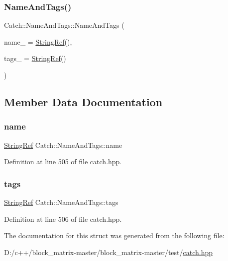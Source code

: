 \subsubsection{\texorpdfstring{Name\+And\+Tags()}{NameAndTags()}}
{\footnotesize\ttfamily Catch\+::\+Name\+And\+Tags\+::\+Name\+And\+Tags (\begin{DoxyParamCaption}\item[{\mbox{\hyperlink{class_catch_1_1_string_ref}{String\+Ref}} const \&}]{name\+\_\+ = {\ttfamily \mbox{\hyperlink{class_catch_1_1_string_ref}{String\+Ref}}()},  }\item[{\mbox{\hyperlink{class_catch_1_1_string_ref}{String\+Ref}} const \&}]{tags\+\_\+ = {\ttfamily \mbox{\hyperlink{class_catch_1_1_string_ref}{String\+Ref}}()} }\end{DoxyParamCaption})\hspace{0.3cm}{\ttfamily [noexcept]}}



\subsection{Member Data Documentation}
\mbox{\label{struct_catch_1_1_name_and_tags_a7cbea60e0cebfa622c667008eb011420}} 
\subsubsection{\texorpdfstring{name}{name}}
{\footnotesize\ttfamily \mbox{\hyperlink{class_catch_1_1_string_ref}{String\+Ref}} Catch\+::\+Name\+And\+Tags\+::name}



Definition at line 505 of file catch.\+hpp.

\mbox{\label{struct_catch_1_1_name_and_tags_a74062ed1138834a348424eb7ed900c57}} 
\subsubsection{\texorpdfstring{tags}{tags}}
{\footnotesize\ttfamily \mbox{\hyperlink{class_catch_1_1_string_ref}{String\+Ref}} Catch\+::\+Name\+And\+Tags\+::tags}



Definition at line 506 of file catch.\+hpp.



The documentation for this struct was generated from the following file\+:\begin{DoxyCompactItemize}
\item 
D\+:/c++/block\+\_\+matrix-\/master/block\+\_\+matrix-\/master/test/\mbox{\hyperlink{catch_8hpp}{catch.\+hpp}}\end{DoxyCompactItemize}
